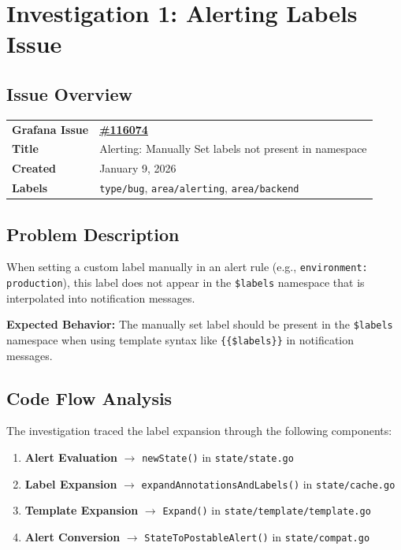 \documentclass[
    11pt,
    a4paper,
    oneside,
    abstract=on,
    parskip=full+,
    headings=big,
    bibliography=totoc
]{scrartcl}
\newcommand{\code}[1]{\texttt{#1}}
\begin{document}
\newpage
\section{Investigation 1: Alerting Labels Issue}

\subsection{Issue Overview}

\begin{tabular}{|l|p{10cm}|}
    \hline
    \rowcolor{light}
    \textbf{Grafana Issue} & \textbf{\href{https://github.com/grafana/grafana/issues/116074}{\#116074}} \\
    \textbf{Title} & Alerting: Manually Set labels not present in namespace \\
    \textbf{Created} & January 9, 2026 \\
    \textbf{Labels} & \texttt{type/bug}, \texttt{area/alerting}, \texttt{area/backend} \\
    \hline
\end{tabular}

\subsection{Problem Description}

When setting a custom label manually in an alert rule (e.g., \code{environment: production}), this label does not appear in the \code{\$labels} namespace that is interpolated into notification messages.

\begin{context}
    \textbf{Expected Behavior:} The manually set label should be present in the \code{\$labels} namespace when using template syntax like \code{\{\{\$labels\}\}} in notification messages.
\end{context}

\subsection{Code Flow Analysis}

The investigation traced the label expansion through the following components:

\begin{enumerate}
    \item \textbf{Alert Evaluation} $\rightarrow$ \code{newState()} in \code{state/state.go}
    \item \textbf{Label Expansion} $\rightarrow$ \code{expandAnnotationsAndLabels()} in \code{state/cache.go}
    \item \textbf{Template Expansion} $\rightarrow$ \code{Expand()} in \code{state/template/template.go}
    \item \textbf{Alert Conversion} $\rightarrow$ \code{StateToPostableAlert()} in \code{state/compat.go}
\end{enumerate}
\end{document}
